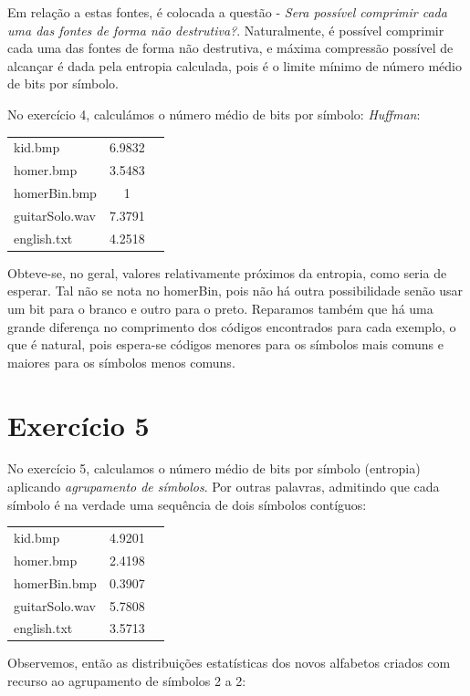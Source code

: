 \documentclass[12pt]{article}
\begin{document}
  Em relação a estas fontes, é colocada a questão - \textit{Sera possível
  comprimir cada uma das fontes de forma não destrutiva?}. Naturalmente, é possível comprimir cada uma das fontes de forma não destrutiva, e máxima compressão possível de alcançar é dada pela entropia calculada, pois é o limite mínimo de número médio de bits por símbolo.

  \pagebreak

  No exercício 4, calculámos o número médio de bits por símbolo:
  \textit{Huffman}:

  \begin{tabular}{ l c r }
    kid.bmp & 6.9832 \\
    homer.bmp & 3.5483 \\
    homerBin.bmp & 1 \\
    guitarSolo.wav & 7.3791 \\
    english.txt & 4.2518 \\
  \end{tabular}


Obteve-se, no geral, valores relativamente próximos da entropia, como seria de esperar. Tal não se nota no homerBin, pois não há outra possibilidade senão usar um bit para o branco e outro para o preto.
Reparamos também que há uma grande diferença no comprimento dos códigos encontrados para cada exemplo, o que é natural, pois espera-se códigos menores para os símbolos mais comuns e maiores para os símbolos menos comuns.

\section{Exercício 5}

  No exercício 5, calculamos o número médio de bits por símbolo (entropia)
  aplicando \textit{agrupamento de símbolos}. Por outras palavras, admitindo
  que cada símbolo é na verdade uma sequência de dois símbolos contíguos:

  \begin{tabular}{ l c r }
    kid.bmp & 4.9201 \\
    homer.bmp & 2.4198 \\
    homerBin.bmp & 0.3907 \\
    guitarSolo.wav & 5.7808 \\
    english.txt & 3.5713 \\
  \end{tabular}

  Observemos, então as distribuições estatísticas dos novos alfabetos criados
  com recurso ao agrupamento de símbolos 2 a 2:
\end{document}
